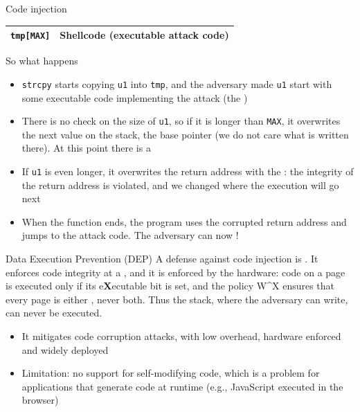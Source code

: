 \begin{parag}{Code injection}
\begin{center}
\begin{tabular}{|c|c|}
            \hline
            \texttt{tmp[MAX]} & Shellcode (executable attack code) \\
            \hline
        \end{tabular}
    \end{center}
    So what happens
    \begin{itemize}
        \item \texttt{strcpy} starts copying \texttt{u1} into \texttt{tmp}, and the adversary made \texttt{u1} start with some executable code implementing the attack (the )
        \item There is no check on the size of \texttt{u1}, so if it is longer than \texttt{MAX}, it overwrites the next value on the stack, the base pointer (we do not care what is written there). At this point there is a 
        \item If \texttt{u1} is even longer, it overwrites the return address with the : the integrity of the return address is violated, and we changed where the execution will go next
        \item When the function ends, the program uses the corrupted return address and jumps to the attack code. The adversary can now !
    \end{itemize}
\end{parag}

\begin{parag}{Data Execution Prevention (DEP)}
    A defense against code injection is . It enforces code integrity at a , and it is enforced by the hardware: code on a page is executed only if its e\textbf{X}ecutable bit is set, and the policy W\textasciicircum{}X ensures that every page is either , never both. Thus the stack, where the adversary can write, can never be executed.
    \begin{itemize}
        \item It mitigates code corruption attacks, with low overhead, hardware enforced and widely deployed
        \item Limitation: no support for self-modifying code, which is a problem for applications that generate code at runtime (e.g., JavaScript executed in the browser)
    \end{itemize}
\end{parag}

